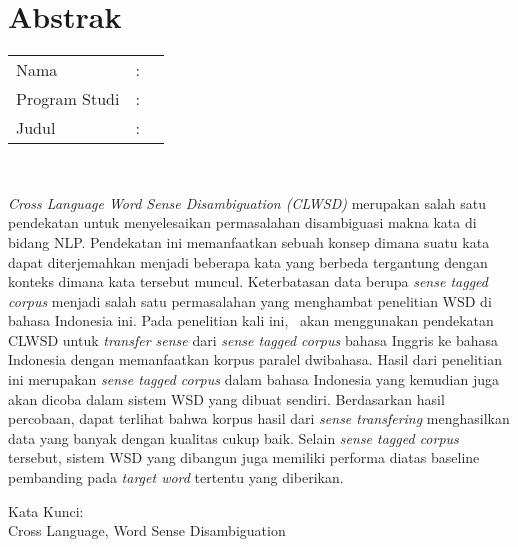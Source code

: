 %
%
%

\chapter*{Abstrak}

\vspace*{0.2cm}

\noindent \begin{tabular}{l l p{10cm}}
	Nama&: & \penulis \\
	Program Studi&: & \program \\
	Judul&: & \judul \\
\end{tabular} \\ 

\vspace*{0.5cm}

\noindent
\textit{Cross Language Word Sense Disambiguation (CLWSD)} merupakan salah satu pendekatan untuk menyelesaikan permasalahan disambiguasi makna kata di bidang NLP. Pendekatan ini memanfaatkan sebuah konsep dimana suatu kata dapat diterjemahkan menjadi beberapa kata yang berbeda tergantung dengan konteks dimana kata tersebut muncul. Keterbatasan data berupa \textit{sense tagged corpus} menjadi salah satu permasalahan yang menghambat penelitian WSD di bahasa Indonesia ini. Pada penelitian kali ini, \saya~akan menggunakan pendekatan CLWSD untuk \textit{transfer sense} dari \textit{sense tagged corpus} bahasa Inggris ke bahasa Indonesia dengan memanfaatkan korpus paralel dwibahasa. Hasil dari penelitian ini merupakan \textit{sense tagged corpus} dalam bahasa Indonesia yang kemudian juga akan dicoba dalam sistem WSD yang dibuat sendiri. Berdasarkan hasil percobaan, dapat terlihat bahwa korpus hasil dari \textit{sense transfering} menghasilkan data yang banyak dengan kualitas cukup baik. Selain \textit{sense tagged corpus} tersebut, sistem WSD yang dibangun juga memiliki performa diatas baseline pembanding pada \textit{target word}  tertentu yang diberikan.


\vspace*{0.2cm}

\noindent Kata Kunci: \\ 
\noindent Cross Language, Word Sense Disambiguation

\newpage